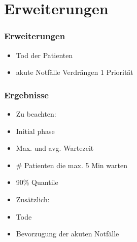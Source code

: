 \documentclass{beamer}
\begin{document}
%
\section{Erweiterungen}
%
%
\begin{frame}
	\frametitle{Erweiterungen}
	\begin{itemize}
		\item Tod der Patienten
		\item akute Notf\"{a}lle Verdr\"{a}ngen 1 Priorit\"{a}t
	\end{itemize}
\end{frame}

\begin{frame}
\end{frame}

\begin{frame}
\end{frame}

\begin{frame}
\end{frame}



%
%
%
\begin{frame}
	\frametitle{Ergebnisse}
	\begin{minipage}{.5\textwidth}
		\begin{flushleft}		
			\begin{itemize}
				\item[] Zu beachten:
				\item Initial phase
				\item Max. und avg. Wartezeit
				\item \# Patienten die max. 5 Min warten
				\item 90\% Quantile
			\end{itemize}
		\end{flushleft}
	\end{minipage}
	\begin{minipage}{.4\textwidth}
		\begin{flushright}
			\begin{itemize}
				\item[] Zus\"{a}tzlich:
				\item Tode
				\item Bevorzugung der akuten Notf\"{a}lle
			\end{itemize}
		\end{flushright}
	\end{minipage}
\end{frame}
\end{document}
